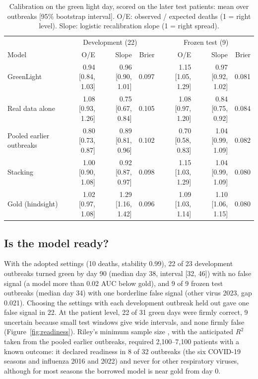 \documentclass[10pt]{article}
\begin{document}
\begin{table}[t]
\centering\small
\caption{Calibration on the green light day, scored on the later test patients: mean over outbreaks [95\% bootstrap
interval]. O/E: observed / expected deaths (1 = right level). Slope: logistic recalibration slope (1 = right spread).}
\label{tab:calibration}
\begin{tabular}{lrrrrrr}
\toprule
& \multicolumn{3}{c}{Development (22)} & \multicolumn{3}{c}{Frozen test (9)} \\
Model & O/E & Slope & Brier & O/E & Slope & Brier \\
\midrule
GreenLight & 0.94 [0.84, 1.03] & 0.96 [0.90, 1.01] & 0.097 & 1.15 [1.05, 1.29] & 0.97 [0.92, 1.02] & 0.081 \\
Real data alone & 1.08 [0.93, 1.26] & 0.75 [0.67, 0.84] & 0.105 & 1.08 [0.97, 1.20] & 0.84 [0.75, 0.92] & 0.084 \\
Pooled earlier outbreaks & 0.80 [0.73, 0.87] & 0.89 [0.81, 0.96] & 0.102 & 0.70 [0.58, 0.83] & 1.04 [0.99, 1.09] & 0.082 \\
Stacking & 1.00 [0.90, 1.08] & 0.92 [0.87, 0.97] & 0.098 & 1.15 [1.03, 1.29] & 1.04 [0.99, 1.09] & 0.080 \\
Gold (hindsight) & 1.02 [0.97, 1.08] & 1.29 [1.16, 1.42] & 0.096 & 1.09 [1.03, 1.14] & 1.10 [1.06, 1.15] & 0.080 \\
\bottomrule
\end{tabular}
\end{table}

\subsection{Is the model ready?}\label{sec:readiness}
With the adopted settings (10 deaths, stability 0.99), 22 of 23 development outbreaks turned green by day 90
(median day 38, interval [32, 46]) with no false signal (a model more than 0.02 AUC below gold), and 9 of 9 frozen
test outbreaks (median day 34) with one borderline false signal (other virus 2023, gap 0.021). Choosing the settings
with each development outbreak held out gave one false signal in 22. At the patient level, 22 of 31 green days were
firmly correct, 9 uncertain because small test windows give wide intervals, and none firmly false
(Figure~\ref{fig:readiness}). Riley's minimum sample size \citep{riley2020samplesize}, with the anticipated
$R^2$ taken from the pooled earlier outbreaks, required 2,100--7,100 patients with a known outcome: it declared readiness in
8 of 32 outbreaks (the six COVID-19 seasons and influenza 2016 and 2022) and never for other respiratory
viruses, although for most seasons the borrowed model is near gold from day 0.
\end{document}
